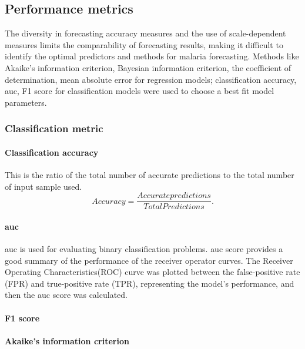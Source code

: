 \documentclass[a4paper, 12pt, twoside]{article}
\begin{document}
\subsection{Performance metrics}%
\label{par:performance_metrics}
The diversity in forecasting accuracy measures and the use of scale-dependent measures limits the comparability of forecasting results, making it difficult to identify the optimal predictors and methods for malaria forecasting.
Methods like Akaike’s information criterion, Bayesian information criterion, the coefficient of determination, mean absolute error for regression models; classification accuracy, \gls{auc}, F1 score for classification models were used to choose a best fit model parameters.
\subsubsection{Classification metric}
\paragraph{Classification accuracy}%
\label{par:classification_accuracy}
This is the ratio of the total number of accurate predictions to the total number of input sample used.
\[
	Accuracy = \frac{Accurate predictions}{Total Predictions}
	.\]

\paragraph{\gls{auc}}%
\label{par:auc}
\gls{auc} is used for evaluating binary classification problems.
\gls{auc} score provides a good summary of the performance of the receiver operator curves.
The Receiver Operating Characteristics(ROC) curve was plotted between the false-positive rate (FPR) and true-positive rate (TPR), representing the model’s performance, and then the \gls{auc} score was calculated.

\paragraph{F1 score}%
\label{par:f1_score}

\paragraph{Akaike's information criterion}%
\label{par:akaike_s_information_criterion}
\end{document}
